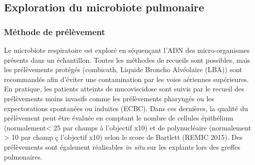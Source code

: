 \documentclass[12pt,a4paper]{article}
\begin{document}
\subsection{Exploration du microbiote pulmonaire}

\subsubsection{Méthode de prélèvement}
Le microbiote respiratoire est exploré en séquençant l'ADN des micro-organismes présents dans un échantillon. 
Toutes les méthodes de recueils sont possibles, mais les prélèvements protégés (combicath, Liquide Broncho Alvéolaire (LBA)) sont recommandés afin
d’éviter une contamination par les voies aériennes supérieures. En pratique, les patients atteints de mucoviscidose sont suivis par le recueil des prélèvements moins invasifs comme les prélèvements pharyngés ou les expectorations spontanées ou induites (ECBC). Dans ces dernières, la qualité du prélèvement peut être évaluée en comptant le nombre de cellules épithélium (normalement< 25 par champs à l'objectif x10) et de polynucléaire (normalement > 10 par champ ç l'objectif x10) selon le score de Bartlett (REMIC 2015). Des prélèvements sont également réalisables \textit{in situ}  sur les explants lors des greffes pulmonaires.
\end{document}

